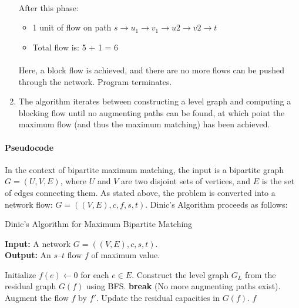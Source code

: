\begin{enumerate}
    \paragraph{} After this phase:
    \begin{itemize}
        \item 1 unit of flow on path \( s \to u_1 \to v_1 \to u2 \to v2 \to t \)
        \item Total flow is: 5 + 1 = 6
    \end{itemize}

    \paragraph{} Here, a block flow is achieved, and there are no more flows can be pushed through the network. Program terminates.

                    
    \item The algorithm iterates between constructing a level graph and computing a blocking flow until no augmenting paths can be found, at which point the maximum flow (and thus the maximum matching) has been achieved.
\end{enumerate}

\paragraph{Pseudocode}
In the context of bipartite maximum matching, the input is a bipartite graph $G = (U, V, E)$, where $U$ and $V$ are two disjoint sets of vertices, and $E$ is the set of edges connecting them. As stated above, the problem is converted into a network flow: $G =((V,E),c,f,s,t)$. Dinic's Algorithm proceeds as follows:

\begin{algorithm}
    \caption{Dinic's Algorithm for Maximum Bipartite Matching}
    
    \textbf{Input:} A network \( G = ((V, E), c, s, t) \). \\
    \textbf{Output:} An \( s \)–\( t \) flow \( f \) of maximum value.
    
    \begin{algorithmic}[1]
    \STATE Initialize \( f(e) \gets 0 \) for each \( e \in E \).
        \STATE Construct the level graph \( G_L \) from the residual graph \( G(f) \) using BFS.
            \STATE \textbf{break} (No more augmenting paths exist).
        \ENDIF
            \STATE Augment the flow \( f \) by \( f' \).
            \STATE Update the residual capacities in \( G(f) \).
        \ENDWHILE
    \ENDWHILE
    \RETURN \( f \)
    \end{algorithmic}
    \end{algorithm}    

